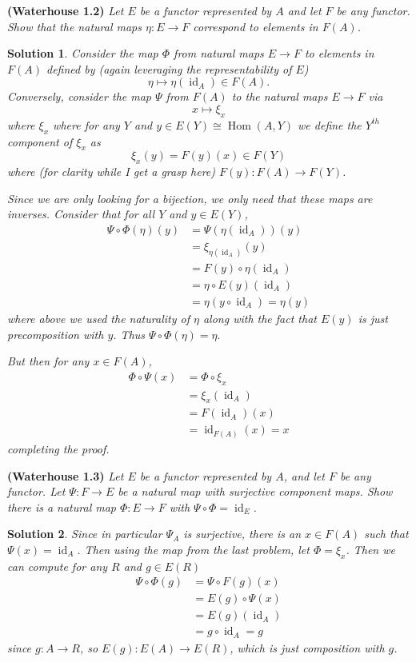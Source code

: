 \documentclass[12pt]{article}
\theoremstyle{nonumberbreak}
\newtheorem{sol}{Solution}
\theoremstyle{changebreak}
\theoremstyle{nonumberplain}
\theoremstyle{change}
\newenvironment{wprob}[1]{\begin{prob}{\normalfont\bfseries (Waterhouse #1) }\itshape}{\end{prob}}
\DeclareMathOperator{\Hom}{Hom}
\begin{document}
\begin{wprob}{1.2}
	Let $E$ be a functor represented by $A$ and let $F$ be any functor. Show that the natural
	maps $\eta:E\to F$ correspond to elements in $F(A)$.
\end{wprob}
\begin{sol}
	Consider the map $\Phi$ from natural maps $E\to F$ to elements in $F(A)$ defined by
	(again leveraging the representability of $E$)
	\[\eta\mapsto \eta(\operatorname{id}_A)\in F(A).\]
	Conversely, consider the map $\Psi$ from $F(A)$ to the natural maps $E\to F$ via
	\[x\mapsto \xi_x\]
	where $\xi_x$ where for any $Y$ and $y\in E(Y)\cong \Hom(A,Y)$ we define the $Y^{th}$ component of $\xi_x$
	as 
	\[\xi_x(y)=F(y)(x)\in F(Y)\]
	where (for clarity while I get a grasp here) $F(y):F(A)\to F(Y)$.

	Since we are only looking for a bijection, we only need that these maps are inverses.
	Consider that for all $Y$ and $y\in E(Y)$,
	\begin{align*}
		\Psi\circ\Phi(\eta)(y)&=\Psi\left(\eta(\operatorname{id}_A)\right)(y)\\
		&= \xi_{\eta(\operatorname{id}_A)}(y)\\
		&= F(y)\circ \eta (\operatorname{id}_A)\\
		&= \eta\circ E(y) (\operatorname{id}_A)\\
		&= \eta(y\circ\operatorname{id}_A)=\eta(y)
	\end{align*}
	where above we used the naturality of $\eta$ along with the fact that $E(y)$ is just
	precomposition with $y$. Thus $\Psi\circ\Phi(\eta)=\eta.$

	But then for any $x\in F(A)$,
	\begin{align*}
		\Phi\circ\Psi(x)&=\Phi\circ\xi_x\\
		&=\xi_x(\operatorname{id}_A)\\
		&=F(\operatorname{id}_A)(x)\\
		&=\operatorname{id}_{F(A)}(x)=x
	\end{align*}
	completing the proof.
\end{sol}

\begin{wprob}{1.3}
	Let $E$ be a functor represented by $A$, and let $F$ be any functor. Let $\Psi:F\to E$
	be a natural map with surjective component maps. Show there is a natural map $\Phi:E\to F$
	with $\Psi\circ\Phi=\operatorname{id}_E$.
\end{wprob}
\begin{sol}
	Since in particular $\Psi_A$ is surjective, there is an $x\in F(A)$ such that $\Psi(x)=\operatorname{id}_A$.
	Then using the map from the last problem, let $\Phi=\xi_x$. Then we can compute for any $R$ and $g\in E(R)$
	\begin{align*}
		\Psi\circ\Phi (g) &= \Psi\circ F(g) (x)\\
		&=E(g)\circ \Psi(x)\\
		&=E(g)(\operatorname{id}_A)\\
		&=g\circ \operatorname{id}_A=g
	\end{align*}
	since $g:A\to R$, so $E(g):E(A)\to E(R)$, which is just composition with $g$.
\end{sol}
\end{document}

